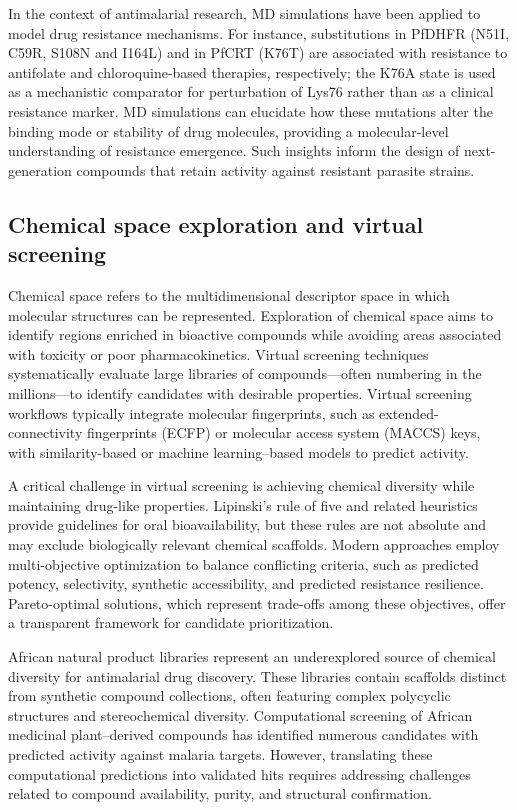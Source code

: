 In the context of antimalarial research, MD simulations have been applied to model drug resistance mechanisms. For instance, substitutions in PfDHFR (N51I, C59R, S108N and I164L) and in PfCRT (K76T) are associated with resistance to antifolate and chloroquine-based therapies, respectively; the K76A state is used as a mechanistic comparator for perturbation of Lys76 rather than as a clinical resistance marker. MD simulations can elucidate how these mutations alter the binding mode or stability of drug molecules, providing a molecular-level understanding of resistance emergence. Such insights inform the design of next-generation compounds that retain activity against resistant parasite strains.

\subsection{Chemical space exploration and virtual screening}

Chemical space refers to the multidimensional descriptor space in which molecular structures can be represented. Exploration of chemical space aims to identify regions enriched in bioactive compounds while avoiding areas associated with toxicity or poor pharmacokinetics. Virtual screening techniques systematically evaluate large libraries of compounds—often numbering in the millions—to identify candidates with desirable properties. Virtual screening workflows typically integrate molecular fingerprints, such as extended-connectivity fingerprints (ECFP) or molecular access system (MACCS) keys, with similarity-based or machine learning–based models to predict activity.

A critical challenge in virtual screening is achieving chemical diversity while maintaining drug-like properties. Lipinski's rule of five and related heuristics provide guidelines for oral bioavailability, but these rules are not absolute and may exclude biologically relevant chemical scaffolds. Modern approaches employ multi-objective optimization to balance conflicting criteria, such as predicted potency, selectivity, synthetic accessibility, and predicted resistance resilience. Pareto-optimal solutions, which represent trade-offs among these objectives, offer a transparent framework for candidate prioritization.

African natural product libraries represent an underexplored source of chemical diversity for antimalarial drug discovery. These libraries contain scaffolds distinct from synthetic compound collections, often featuring complex polycyclic structures and stereochemical diversity. Computational screening of African medicinal plant–derived compounds has identified numerous candidates with predicted activity against malaria targets. However, translating these computational predictions into validated hits requires addressing challenges related to compound availability, purity, and structural confirmation.

